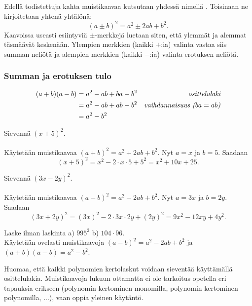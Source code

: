 Edellä todistettuja kahta muistikaavaa kutsutaan yhdessä nimellä . Toisinaan ne kirjoitetaan yhtenä yhtälönä:
$$(a \pm b)^2=a^2 \pm 2ab+b^2.$$
Kaavoissa useasti esiintyviä $\pm$-merkkejä luetaan siten, että ylemmät ja alemmat täsmäävät keskenään. Ylempien merkkien (kaikki $+$:ia) valinta vastaa siis summan neliötä ja alempien merkkien (kaikki $-$:ia) valinta erotuksen neliötä.

\subsubsection*{Summan ja erotuksen tulo}

\begin{align*}
(a+b)(a-b) &= a^2-ab+ba-b^2 &\emph{osittelulaki} \\
&= a^2-ab+ab-b^2 &\emph{vaihdannaisuus ($ba=ab$)} \\
&= a^2-b^2
\end{align*}

\begin{esimerkki}
Sievennä $(x+5)^2$. \\
\quad\\
Käytetään muistikaavaa $(a+b)^2 = a^2+2ab+b^2$. Nyt $a = x$ ja $b = 5$.
Saadaan
        \[ (x+5)^2 = x^2-2\cdot x\cdot 5+5^2 = x^2+10x+25. \]
\end{esimerkki}

\begin{esimerkki}
Sievennä $(3x-2y)^2$. \\
\quad\\
Käytetään muistikaavaa $(a-b)^2 = a^2-2ab+b^2$. Nyt $a = 3x$ ja $b = 2y$.
Saadaan
        \[ (3x+2y)^2 = (3x)^2-2\cdot 3x\cdot 2y+(2y)^2 = 9x^2-12xy+4y^2. \]
\end{esimerkki}

\begin{esimerkki}
Laske ilman laskinta a) $995^2$ b) $104 \cdot 96$. \\
Käytetään ovelasti muistikaavoja $(a-b)^2 = a^2-2ab+b^2$ ja \mbox{$(a+b)(a-b) = a^2-b^2$}.
\begin{alakohdat}
\end{alakohdat}
\end{esimerkki}

Huomaa, että kaikki polynomien kertolaskut voidaan sieventää käyttämällä osittelulakia. Muistikaavoja lukuun ottamatta ei ole tarkoitus opetella eri tapauksia erikseen (polynomin kertominen monomilla, polynomin kertominen polynomilla, ...), vaan oppia yleinen käytäntö.

